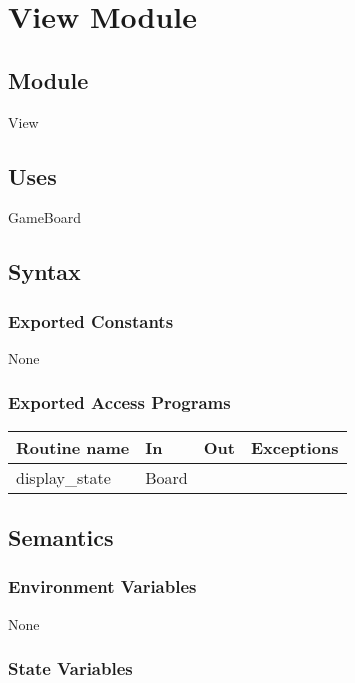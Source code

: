 \documentclass[12pt]{article}
\begin{document}
\newpage
\section* {View Module}

\subsection* {Module}

View

\subsection* {Uses}

GameBoard

\subsection* {Syntax}

\subsubsection* {Exported Constants}

None

\subsubsection* {Exported Access Programs}

\begin{tabular}{| l | l | l | l |}
\hline
\textbf{Routine name} & \textbf{In} & \textbf{Out} & \textbf{Exceptions}\\
\hline
display\_state & Board & ~ & ~\\
\hline
\end{tabular}

\subsection* {Semantics}

\subsubsection* {Environment Variables}

None

\subsubsection* {State Variables}
\end{document}
